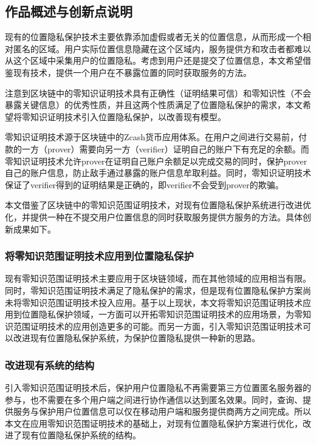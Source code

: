 \documentclass[zihao=-4]{ctexart}
\begin{document}
\subsection{作品概述与创新点说明}
现有的位置隐私保护技术主要依靠添加虚假或者无关的位置信息，从而形成一个相对匿名的区域。用户实际位置信息隐藏在这个区域内，服务提供方和攻击者都难以从这个区域中采集用户的位置隐私。考虑到用户还是提交了位置信息，本文希望借鉴现有技术，提供一个用户在不暴露位置的同时获取服务的方法。
\par 
注意到区块链中的零知识证明技术具有正确性（证明结果可信）和零知识性（不会暴露关键信息）的优秀性质，并且这两个性质满足了位置隐私保护的需求，本文希望将零知识证明技术引入位置隐私保护，以改善现有模型。
\par 
零知识证明技术源于区块链中的Zcash货币应用体系。在用户之间进行交易前，付款的一方（prover）需要向另一方（verifier）证明自己的账户下有充足的余额。而零知识证明技术允许prover在证明自己账户余额足以完成交易的同时，保护prover自己的账户信息，防止敌手通过暴露的账户信息牟取利益。同时，零知识证明技术保证了verifier得到的证明结果是正确的，即verifier不会受到prover的欺骗。
\par 
本文借鉴了区块链中的零知识范围证明技术，对现有位置隐私保护系统进行改进优化，并提供一种在不提交用户位置信息的同时获取服务提供方服务的方法。具体创新成果如下。

\subsubsection{将零知识范围证明技术应用到位置隐私保护}
现有零知识范围证明技术主要应用于区块链领域，而在其他领域的应用相当有限。同时，零知识范围证明技术满足了隐私保护的需求，但是现有位置隐私保护方案尚未将零知识范围证明技术投入应用。基于以上现状，本文将零知识范围证明技术应用到位置隐私保护领域，一方面可以开拓零知识范围证明技术的应用场景，为零知识范围证明技术的应用创造更多的可能。而另一方面，引入零知识范围证明技术可以改进现有位置隐私保护系统，为保护位置隐私提供一种新的思路。

\subsubsection{改进现有系统的结构}
引入零知识范围证明技术后，保护用户位置隐私不再需要第三方位置匿名服务器的参与，也不需要在多个用户端之间进行协作通信以达到匿名效果。同时，查询、提供服务与保护用户位置信息可以仅在移动用户端和服务提供商两方之间完成。所以本文在应用零知识范围证明技术的基础上，对现有位置隐私保护方案进行优化，改进了现有位置隐私保护系统的结构。
\end{document}
